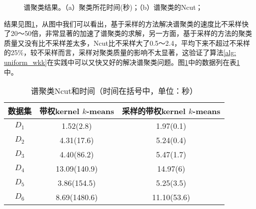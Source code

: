 \begin{figure}[h]
    \caption{谱聚类结果。（a）聚类所花时间(秒)；（b）谱聚类的Ncut；}
    \label{fig: sp-experiments}
\end{figure}
结果见图\ref{fig: sp-experiments}，从图中我们可以看出，基于采样的方法解决谱聚类的速度比不采样快了20～50倍，非常显著的加速了谱聚类的求解，另一方面，基于采样的方法的聚类质量又没有比不采样差太多，Ncut比不采样大了0.5～2.4，平均下来不超过不采样的25\%，较不采样而言，采样对聚类质量的影响不太显著，这验证了算法\ref{alg: uniform_wkk}在实践中可以又快又好的解决谱聚类问题。图\ref{fig: sp-experiments}中的数据列在表\ref{tab: res_spectral_cls}中。
\begin{table}[h]
	\caption{谱聚类Ncut和时间（时间在括号中，单位：秒）}
	\label{tab: res_spectral_cls}
	\begin{tabular}{ccc}
		\toprule
		数据集 & 带权kernel $k$-means & 采样的带权kernel $k$-means \\
		\midrule
		$D_1$ & 1.52(2.8) & 1.97(0.1) \\
		$D_2$ & 4.31(17.6) & 5.24(0.4) \\
		$D_3$ & 4.40(86.2) & 5.47(1.7) \\
		$D_4$ & 13.09(140.9) & 14.97(6) \\
		$D_5$ & 3.86(154.5) & 5.25(3.5) \\
		$D_6$ & 8.69(1480.6) & 11.10(53.6) \\
		\bottomrule
	\end{tabular}
\end{table}

